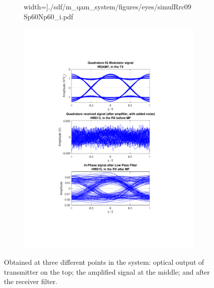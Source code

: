 \begin{refsection}
\begin{figure}[H]
\begin{minipage}{\linewidth}
\begin{subfigure}{.45\textwidth}
		width=\textwidth]{./sdf/m_qam_system/figures/eyes/simulRrc09Sp60Np60_i.pdf}
	\end{subfigure}
	\begin{subfigure}{.45\textwidth}
		\centering
		\includegraphics[clip, trim=4cm 4cm 4cm 4cm, 
		width=\textwidth]{./sdf/m_qam_system/figures/eyes/simulRrc09Sp60Np60_q.pdf}
	\end{subfigure}
	
	\caption{
		Obtained at three different points in the system: optical output of transmitter on the top;
		the amplified signal at the middle; and
		after the receiver filter.
		\label{fig:eyes_n_rrc_60_09}}
	\end{minipage}
\end{figure}



\end{refsection}
